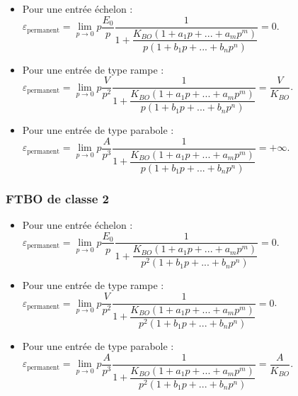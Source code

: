 \begin{itemize}
\item Pour une entrée échelon : 
$\varepsilon_{\text{permanent}}=\lim\limits_{p\to 0} p\dfrac{E_0}{p}\dfrac{1}{1+\dfrac{K_{BO}\left(1+a_1p+...+a_mp^m \right)}{p\left(1+b_1p+...+b_np^n\right)}} 
= 0$.
\item Pour une entrée de type rampe : 
$\varepsilon_{\text{permanent}}=\lim\limits_{p\to 0} p\dfrac{V}{p^2}\dfrac{1}{1+\dfrac{K_{BO}\left(1+a_1p+...+a_mp^m \right)}{p\left(1+b_1p+...+b_np^n\right)}} 
=\dfrac{V}{K_{BO}}$.
\item Pour une entrée de type parabole : 
$\varepsilon_{\text{permanent}}=\lim\limits_{p\to 0} p\dfrac{A}{p^3}\dfrac{1}{1+\dfrac{K_{BO}\left(1+a_1p+...+a_mp^m \right)}{p\left(1+b_1p+...+b_np^n\right)}} 
=+\infty$.
\end{itemize}

\subsubsection*{FTBO de classe 2}

\begin{itemize}
\item Pour une entrée échelon : 
$\varepsilon_{\text{permanent}}=\lim\limits_{p\to 0} p\dfrac{E_0}{p}\dfrac{1}{1+\dfrac{K_{BO}\left(1+a_1p+...+a_mp^m \right)}{p^{2}\left(1+b_1p+...+b_np^n\right)}} 
= 0$.
\item Pour une entrée de type rampe : 
$\varepsilon_{\text{permanent}}=\lim\limits_{p\to 0} p\dfrac{V}{p^2}\dfrac{1}{1+\dfrac{K_{BO}\left(1+a_1p+...+a_mp^m \right)}{p^{2}\left(1+b_1p+...+b_np^n\right)}} 
=0$.
\item Pour une entrée de type parabole : 
$\varepsilon_{\text{permanent}}=\lim\limits_{p\to 0} p\dfrac{A}{p^3}\dfrac{1}{1+\dfrac{K_{BO}\left(1+a_1p+...+a_mp^m \right)}{p^{2}\left(1+b_1p+...+b_np^n\right)}} 
=\dfrac{A}{K_{BO}}$.
\end{itemize}


